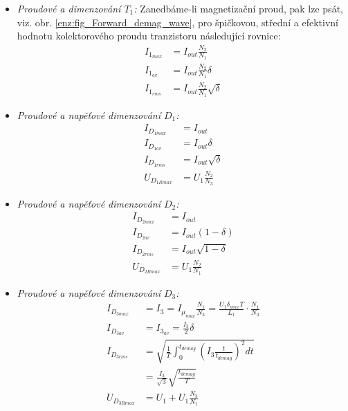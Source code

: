     \begin{itemize}
      \item \emph{Proudové a dimenzování $T_1$:}
         \newline Zanedbáme-li magnetizační proud, pak lze psát, viz. obr.
         \ref{enz:fig_Forward_demag_wave}, pro špičkovou, střední a efektivní hodnotu
         kolektorového proudu tranzistoru následující rovnice:
          \begin{align}
              I_{1_{max}} &= I_{out}\frac{N_2}{N_1}             \\
              I_{1_{av}}  &= I_{out}\frac{N_2}{N_1}\delta       \\
              I_{1_{rms}} &= I_{out}\frac{N_2}{N_1}\sqrt{\delta}
          \end{align}
      \item \emph{Proudové a napěťové dimenzování $D_1$:}
          \begin{align}
              I_{D_{1max}} &= I_{out}                \\
              I_{D_{1av}}  &= I_{out}\delta          \\
              I_{D_{1rms}} &= I_{out}\sqrt{\delta}   \\
              U_{D_{1Rmax}}&= U_1\frac{N_2}{N_3}
          \end{align}
      \item \emph{Proudové a napěťové dimenzování $D_2$:}
          \begin{align}
              I_{D_{2max}} &= I_{out}                \\
              I_{D_{2av}}  &= I_{out}(1-\delta)      \\
              I_{D_{2rms}} &= I_{out}\sqrt{1-\delta} \\
              U_{D_{2Rmax}}&= U_1\frac{N_2}{N_1}
          \end{align}
      \item \emph{Proudové a napěťové dimenzování $D_3$:}
          \begin{align}
              I_{D_{3max}} &= I_3        = I_{\mu_{max}}\frac{N_1}{N_3}           
                            = \frac{U_1\delta_{max}T}{L_1}\cdot\frac{N_1}{N_3}                \\
              I_{D_{3av}}  &= I_{3_{av}} = \frac{I_3}{2}\delta                                \\
              I_{D_{3rms}} &=  \sqrt{\frac{1}{T}\int_0^{t_{demag}}
                              {\left(I_3\frac{t}{t_{demag}}\right)^2}dt}            \nonumber \\ 
                           &= \frac{I_3}{\sqrt{3}}\sqrt{\frac{t_{demag}}{T}}                  \\
              U_{D_{3Rmax}}&= U_1 + U_1\frac{N_3}{N_1}
          \end{align}
    \end{itemize}
